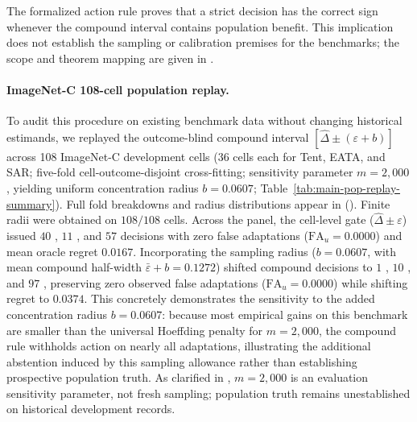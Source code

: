 The formalized action rule proves that a strict decision has the correct sign whenever the
compound interval contains population benefit. This implication does not establish the
sampling or calibration premises for the benchmarks; the scope and theorem mapping are given
in .

\paragraph{ImageNet-C 108-cell population replay.}
To audit this procedure on existing benchmark data without changing historical estimands, we replayed the outcome-blind compound interval $[\widehat\Delta \pm (\varepsilon + b)]$ across 108 ImageNet-C development cells (36 cells each for Tent, EATA, and SAR; five-fold cell-outcome-disjoint cross-fitting; sensitivity parameter $m=2{,}000$, yielding uniform concentration radius $b=0.0607$; Table~\ref{tab:main-pop-replay-summary}). Full fold breakdowns and radius distributions appear in  ().
Finite radii were obtained on $108/108$ cells. Across the panel, the cell-level gate ($\widehat\Delta \pm \varepsilon$) issued $40$ \adapt, $11$ \freeze, and $57$ \abstain decisions with zero false adaptations ($\mathrm{FA}_u = 0.0000$) and mean oracle regret $0.0167$. Incorporating the sampling radius ($b=0.0607$, with mean compound half-width $\bar\varepsilon + b = 0.1272$) shifted compound decisions to $1$ \adapt, $10$ \freeze, and $97$ \abstain, preserving zero observed false adaptations ($\mathrm{FA}_u = 0.0000$) while shifting regret to $0.0374$. This concretely demonstrates the sensitivity to the added concentration radius $b=0.0607$: because most empirical gains on this benchmark are smaller than the universal Hoeffding penalty for $m=2{,}000$, the compound rule withholds action on nearly all adaptations, illustrating the additional abstention induced by this sampling allowance rather than establishing prospective population truth. As clarified in , $m=2{,}000$ is an evaluation sensitivity parameter, not fresh sampling; population truth remains unestablished on historical development records.

